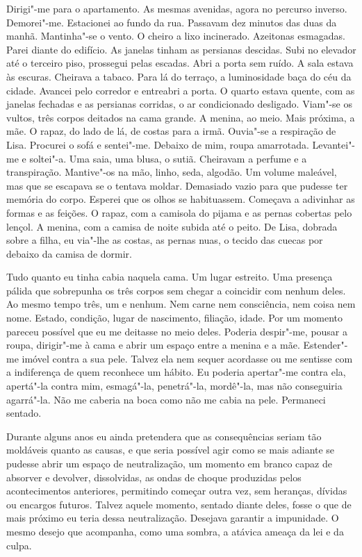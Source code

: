 Dirigi"-me para o apartamento. As mesmas avenidas, agora no percurso
inverso. Demorei"-me. Estacionei ao fundo da rua. Passavam dez minutos
das duas da manhã. Mantinha"-se o vento. O cheiro a lixo incinerado.
Azeitonas esmagadas. Parei diante do edifício. As janelas tinham as persianas descidas.
Subi no elevador até o terceiro piso, prossegui pelas
escadas. Abri a porta sem ruído. A sala estava às escuras. Cheirava a
tabaco. Para lá do terraço, a luminosidade baça do céu da cidade.
Avancei pelo corredor e entreabri a porta. O quarto estava quente, com
as janelas fechadas e as persianas corridas, o ar condicionado desligado.
Viam"-se os vultos, três corpos deitados na cama grande. A menina, ao
meio. Mais próxima, a mãe. O rapaz, do lado de lá, de costas para a
irmã. Ouvia"-se a respiração de Lisa. Procurei o sofá e sentei"-me.
Debaixo de mim, roupa amarrotada. Levantei"-me e soltei"-a. Uma saia,
uma blusa, o sutiã. Cheiravam a perfume e a transpiração. Mantive"-os na
mão, linho, seda, algodão. Um volume maleável, mas que se escapava se o
tentava moldar. Demasiado vazio para que pudesse ter memória do corpo.
Esperei que os olhos se habituassem. Começava a adivinhar as formas e as
feições. O rapaz, com a camisola do pijama e as pernas cobertas pelo
lençol. A menina, com a camisa de noite subida até o peito. De Lisa,
dobrada sobre a filha, eu via"-lhe as costas, as pernas nuas, o tecido
das cuecas por debaixo da camisa de dormir.

Tudo quanto eu tinha cabia naquela cama. Um lugar estreito. Uma presença
pálida que sobrepunha os três corpos sem chegar a coincidir com nenhum
deles. Ao mesmo tempo três, um e nenhum. Nem carne nem consciência, nem
coisa nem nome. Estado, condição, lugar de nascimento, filiação, idade.
Por um momento pareceu possível que eu me deitasse no meio deles.
Poderia despir"-me, pousar a roupa, dirigir"-me à cama e abrir um espaço
entre a menina e a mãe. Estender"-me imóvel contra a sua pele. Talvez
ela nem sequer acordasse ou me sentisse com a indiferença de quem
reconhece um hábito. Eu poderia apertar"-me contra ela, apertá"-la
contra mim, esmagá"-la, penetrá"-la, mordê"-la, mas não conseguiria
agarrá"-la. Não me caberia na boca como não me cabia na pele. Permaneci
sentado.

Durante alguns anos eu ainda pretendera que as consequências seriam tão
moldáveis quanto as causas, e que seria possível agir como se mais
adiante se pudesse abrir um espaço de neutralização, um momento em
branco capaz de absorver e devolver, dissolvidas, as ondas de choque
produzidas pelos acontecimentos anteriores, permitindo começar outra
vez, sem heranças, dívidas ou encargos futuros. Talvez aquele momento,
sentado diante deles, fosse o que de mais próximo eu teria dessa
neutralização. Desejava garantir a impunidade. O mesmo desejo que
acompanha, como uma sombra, a atávica ameaça da lei e da culpa.

